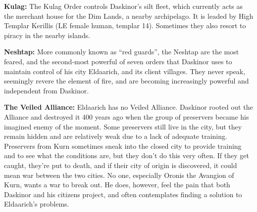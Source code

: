 {
\textbf{Kulag:} The Kulag Order controls Daskinor’s silt fleet, which currently acts as the merchant house for the Dim Lands, a nearby archipelago. It is leaded by High Templar Kerillis (LE female human, templar 14). Sometimes they also resort to piracy in the nearby islands.

\textbf{Neshtap:} More commonly known as “red guards”, the Neshtap are the most feared, and the second‐most powerful of seven orders that Daskinor uses to maintain control of his city Eldaarich, and its client villages. They never speak, seemingly revere the element of fire, and are becoming increasingly powerful and independent from Daskinor.

\textbf{The Veiled Alliance:} Eldaarich has no Veiled Alliance. Daskinor rooted out the Alliance and destroyed it 400 years ago when the group of preservers became his imagined enemy of the moment. Some preservers still live in the city, but they remain hidden and are relatively weak due to a lack of adequate training. Preservers from Kurn sometimes sneak into the closed city to provide training and to see what the conditions are, but they don’t do this very often. If they get caught, they’re put to death, and if their city of origin is discovered, it could mean war between the two cities. No one, especially Oronis the Avangion of Kurn, wants a war to break out. He does, however, feel the pain that both Daskinor and his citizens project, and often contemplates finding a solution to Eldaarich’s problems.
}
{}{}
